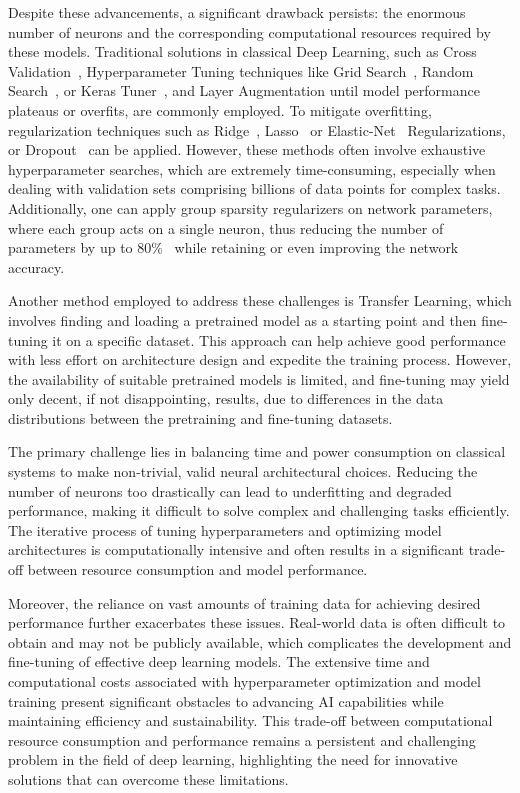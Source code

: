 \documentclass[12pt,a4paper]{report}
\begin{document}
Despite these advancements, a significant drawback persists: the enormous number of neurons and the corresponding computational resources required by these models. Traditional solutions in classical Deep Learning, such as Cross Validation~\cite{berrar2019cross}, Hyperparameter Tuning techniques like Grid Search~\cite{liashchynskyi2019grid}, Random Search~\cite{liashchynskyi2019grid}, or Keras Tuner~\cite{pon2021hyperparameter}, and Layer Augmentation until model performance plateaus or overfits, are commonly employed. To mitigate overfitting, regularization techniques such as Ridge~\cite{ogutu2012genomic}, Lasso~\cite{ogutu2012genomic} or Elastic-Net~\cite{ogutu2012genomic} Regularizations, or Dropout~\cite{srivastava2014dropout} can be applied. However, these methods often involve exhaustive hyperparameter searches, which are extremely time-consuming, especially when dealing with validation sets comprising billions of data points for complex tasks. Additionally, one can apply group sparsity regularizers on network parameters, where each group acts on a single neuron, thus reducing the number of parameters by up to 80\%~\cite{alvarez2018learning} while retaining or even improving the network accuracy.

Another method employed to address these challenges is Transfer Learning, which involves finding and loading a pretrained model as a starting point and then fine-tuning it on a specific dataset. This approach can help achieve good performance with less effort on architecture design and expedite the training process. However, the availability of suitable pretrained models is limited, and fine-tuning may yield only decent, if not disappointing, results, due to differences in the data distributions between the pretraining and fine-tuning datasets.

The primary challenge lies in balancing time and power consumption on classical systems to make non-trivial, valid neural architectural choices. Reducing the number of neurons too drastically can lead to underfitting and degraded performance, making it difficult to solve complex and challenging tasks efficiently. The iterative process of tuning hyperparameters and optimizing model architectures is computationally intensive and often results in a significant trade-off between resource consumption and model performance.

Moreover, the reliance on vast amounts of training data for achieving desired performance further exacerbates these issues. Real-world data is often difficult to obtain and may not be publicly available, which complicates the development and fine-tuning of effective deep learning models. The extensive time and computational costs associated with hyperparameter optimization and model training present significant obstacles to advancing AI capabilities while maintaining efficiency and sustainability. This trade-off between computational resource consumption and performance remains a persistent and challenging problem in the field of deep learning, highlighting the need for innovative solutions that can overcome these limitations.
\end{document}
